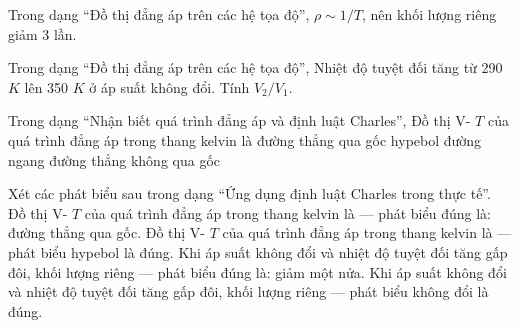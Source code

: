 \begin{bt}
Trong dạng “Đồ thị đẳng áp trên các hệ tọa độ”, $\rho\sim1/T$, nên khối lượng riêng giảm 3 lần.
\end{bt}

\begin{ex}
Trong dạng “Đồ thị đẳng áp trên các hệ tọa độ”, Nhiệt độ tuyệt đối tăng từ 290 $K$ lên 350 $K$ ở áp suất không đổi. Tính $V_2/V_1$.
\end{ex}

\begin{ex}
Trong dạng “Nhận biết quá trình đẳng áp và định luật Charles”, Đồ thị V- $T$ của quá trình đẳng áp trong thang kelvin là
\choice
{\True đường thẳng qua gốc}
{hypebol}
{đường ngang}
{đường thẳng không qua gốc}
\end{ex}

\begin{ex}
Xét các phát biểu sau trong dạng “Ứng dụng định luật Charles trong thực tế”.
\choiceTF
{\True Đồ thị V- $T$ của quá trình đẳng áp trong thang kelvin là — phát biểu đúng là: đường thẳng qua gốc.}
{Đồ thị V- $T$ của quá trình đẳng áp trong thang kelvin là — phát biểu hypebol là đúng.}
{\True Khi áp suất không đổi và nhiệt độ tuyệt đối tăng gấp đôi, khối lượng riêng — phát biểu đúng là: giảm một nửa.}
{Khi áp suất không đổi và nhiệt độ tuyệt đối tăng gấp đôi, khối lượng riêng — phát biểu không đổi là đúng.}
\end{ex}

